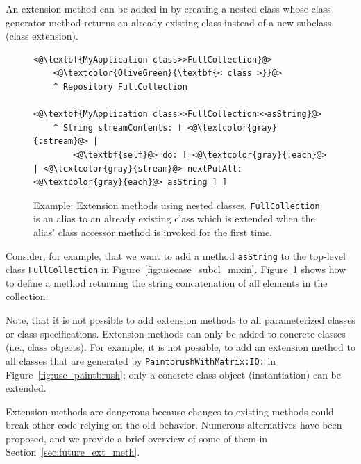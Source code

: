 An extension method can be added in \msname by creating a nested class whose class generator method returns an already existing class instead of a new subclass (class extension).

\begin{figure}[!htp]
\begin{lstlisting}
<@\textbf{MyApplication class>>FullCollection}@>
    <@\textcolor{OliveGreen}{\textbf{< class >}}@>
    ^ Repository FullCollection

<@\textbf{MyApplication class>>FullCollection>>asString}@>
    ^ String streamContents: [ <@\textcolor{gray}{:stream}@> |
        <@\textbf{self}@> do: [ <@\textcolor{gray}{:each}@> | <@\textcolor{gray}{stream}@> nextPutAll: <@\textcolor{gray}{each}@> asString ] ]
\end{lstlisting}
\caption[Example: Extension methods using nested classes]{Example: Extension methods using nested classes. \texttt{FullCollection} is an alias to an already existing class which is extended when the alias' class accessor method is invoked for the first time.}
\label{fig:use_ext_meth}
\end{figure}

Consider, for example, that we want to add a method \texttt{asString} to the top-level class \texttt{FullCollection} in Figure~\ref{fig:usecase_subcl_mixin}. Figure~\ref{fig:use_ext_meth} shows how to define a method returning the string concatenation of all elements in the collection.


Note, that it is not possible to add extension methods to all parameterized classes or class specifications. Extension methods can only be added to concrete classes (i.e., class objects). For example, it is not possible, to add an extension method to all classes that are generated by \texttt{PaintbrushWithMatrix:IO:} in Figure~\ref{fig:use_paintbrush}; only a concrete class object (instantiation) can be extended.

Extension methods are dangerous because changes to existing methods could break other code relying on the old behavior. Numerous alternatives have been proposed, and we provide a brief overview of some of them in Section~\ref{sec:future_ext_meth}.
